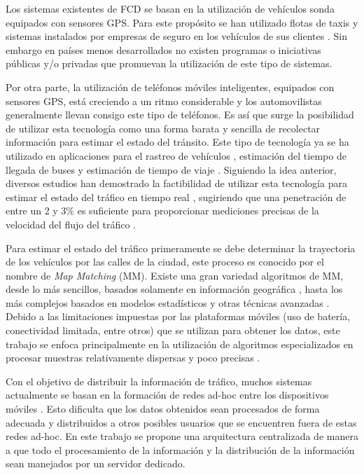 Los sistemas existentes de FCD se basan en la utilización de vehículos sonda equipados con sensores GPS. Para este propósito se han utilizado flotas de taxis \citep{schafer2002traffic,reinthaler2007evaluation} y sistemas instalados por empresas de seguro en los vehículos de sus clientes \citep{giovannini2011novel}. Sin embargo en países menos desarrollados no existen programas o iniciativas públicas y/o privadas que promuevan la utilización de este tipo de sistemas.

Por otra parte, la utilización de teléfonos móviles inteligentes, equipados con sensores GPS, está creciendo a un ritmo considerable y los automovilistas generalmente llevan consigo este tipo de teléfonos. Es así que surge la posibilidad de utilizar esta tecnología como una forma barata y sencilla de recolectar información para estimar el estado del tránsito. Este tipo de tecnología ya se ha utilizado en aplicaciones para el rastreo de vehículos \citep{thiagarajan2010cooperative}, estimación del tiempo de llegada de buses \citep{zhou2012long} y estimación de tiempo de viaje \citep{thiagarajan2009vtrack}. Siguiendo la idea anterior, diversos estudios han demostrado la factibilidad de utilizar esta tecnología para estimar el estado del tráfico en tiempo real \citep{tao2012real,herrera2010evaluation}, sugiriendo que una penetración de entre un 2 y 3\% es suficiente para proporcionar mediciones precisas de la velocidad del flujo del tráfico \citep{herrera2010evaluation}.

Para estimar el estado del tráfico primeramente se debe determinar la trayectoria de los vehículos por las calles de la ciudad, este proceso es conocido por el nombre de \emph{Map Matching} (MM). Existe una gran variedad algoritmos de MM, desde lo más sencillos, basados solamente en información geográfica \citep{white2000some}, hasta los más complejos basados en modelos estadísticos y otras técnicas avanzadas \citep{quddus2006high,kim2001adaptive}. Debido a las limitaciones impuestas por las plataformas móviles (uso de batería, conectividad limitada, entre otros) que se utilizan para obtener los datos, este trabajo se enfoca principalmente en la utilización de algoritmos especializados en procesar muestras relativamente dispersas y poco precisas \citep{lou2009map}.

Con el objetivo de distribuir la información de tráfico, muchos sistemas actualmente se basan en la formación de redes ad-hoc entre los dispositivos móviles \citep{zhong2008disseminating,leontiadis2011effectiveness}. Esto dificulta que los datos obtenidos sean procesados de forma adecuada y distribuidos a otros posibles usuarios que se encuentren fuera de estas redes ad-hoc. En este trabajo se propone una arquitectura centralizada de manera a que todo el procesamiento de la información y la distribución de la información sean manejados por un servidor dedicado.

